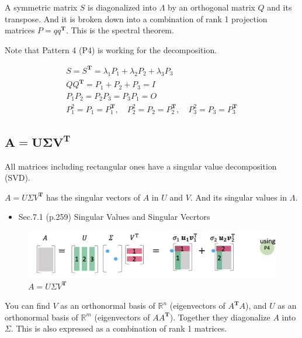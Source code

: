 \documentclass[letterpaper]{article}
\begin{document}
A symmetric matrix $S$ is diagonalized into $\Lambda$  by an orthogonal matrix $Q$
and its transpose. And it is broken down into a combination of rank 1 projection matrices $P=qq^\mathbf{T}$.
This is the spectral theorem.

Note that Pattern 4 (P4) is working for the decomposition.

\begin{gather*}
  S=S^\mathbf{T} = \lambda_1 P_1 + \lambda_2 P_2 + \lambda_3 P_3\\
  QQ^\mathbf{T} = P_1 + P_2 + P_3 = I \\
  P_1 P_2 = P_2 P_3 = P_3 P_1 = O\\
  P_1^2 =P_1=P_1^\mathbf{T}, \quad P_2^2=P_2=P_2^\mathbf{T}, \quad P_3^2=P_3=P_3^\mathbf{T}
\end{gather*}

\clearpage

\subsection{$\boldsymbol{A=U \Sigma V^\mathbf{T}}$}

All matrices including rectangular ones have a singular value decomposition (SVD).

$A=U \Sigma V^\mathbf{T}$ has the singular vectors of $A$ in $U$ and $V$.
And its singular values in $\Lambda$.

\begin{itemize}
  \item Sec.7.1 (p.259) Singular Values and Singular Vecrtors
\end{itemize}


\begin{figure}[H]
  \includegraphics[keepaspectratio, width=\linewidth]{SVD.png}
  \caption{$A=U \Sigma V^\mathbf{T}$}
\end{figure}

You can find $V$ as an orthonormal basis of $\mathbb{R}^n$ (eigenvectors of $A^\mathbf{T}A$),
and $U$ as an orthonormal basis of $\mathbb{R}^m$ (eigenvectors of $AA^\mathbf{T}$).
Together they diagonalize $A$ into $\Sigma$.
This is also expressed as a combination of rank 1 matrices.
\end{document}

